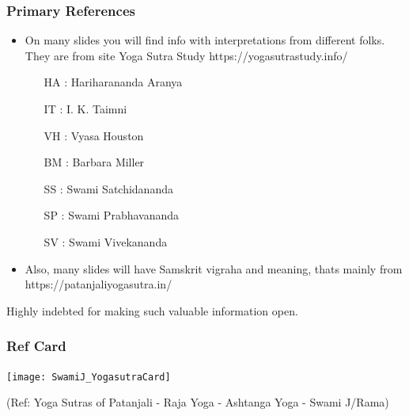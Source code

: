 \begin{frame}[fragile]\frametitle{Primary References}
	\begin{itemize}
	\item On many slides you will find info with interpretations from different folks. They are from  site Yoga Sutra Study https://yogasutrastudy.info/
		\begin{itemize}
		\item [HA]: Hariharananda Aranya
		\item [IT]: I. K. Taimni
		\item [VH]: Vyasa Houston
		\item [BM]: Barbara Miller
		\item [SS]: Swami Satchidananda
		\item [SP]: Swami Prabhavananda
		\item [SV]: Swami Vivekananda
		\end{itemize}	
	\item Also, many slides will have Samskrit vigraha and meaning, thats mainly from https://patanjaliyogasutra.in/
	\end{itemize}

Highly indebted for making such valuable information open.

\end{frame}

\begin{frame}[fragile]\frametitle{Ref Card}

\begin{center}
\texttt{[image: SwamiJ\_YogasutraCard]}

\end{center}

  
  \tiny{(Ref: Yoga Sutras of Patanjali - Raja Yoga - Ashtanga Yoga - Swami J/Rama)}

\end{frame}



